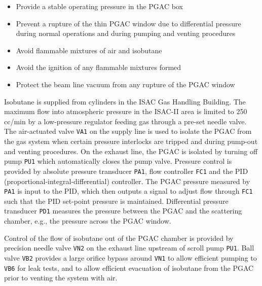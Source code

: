 \begin{itemize}
\setlength{\itemsep}{0pt}
\setlength{\parskip}{0pt}
\setlength{\parsep}{0pt}
	\item Provide a stable operating pressure in the PGAC box
	\item Prevent a rupture of the thin PGAC window due to differential pressure during normal operations and during pumping and venting procedures
	\item Avoid flammable mixtures of air and isobutane
	\item Avoid the ignition of any flammable mixtures formed
	\item Protect the beam line vacuum from any rupture of the PGAC window
\end{itemize}

Isobutane is supplied from cylinders in the ISAC Gas Handling Building. The maximum flow into atmospheric pressure in the ISAC-II area is limited to 250\,cc/min by a low-pressure regulator feeding gas through a pre-set needle valve. The air-actuated valve \texttt{VA1} on the supply line 
is used to isolate the PGAC from the gas system when certain pressure interlocks are tripped and during pump-out and venting procedures.  On the  exhaust line, the PGAC is isolated by turning off pump \texttt{PU1} which automatically closes the pump valve.
Pressure control is provided by absolute pressure transducer \texttt{PA1}, flow controller \texttt{FC1} and the PID (proportional-integral-differential) controller. The PGAC pressure measured by \texttt{PA1} is input to the PID, which then outputs a signal to adjust flow through \texttt{FC1} such that the PID set-point pressure is maintained. %
 Differential pressure transducer \texttt{PD1} measures the pressure between the PGAC and the scattering chamber, e.g., the pressure across the PGAC window.%

Control of the flow of isobutane out of the PGAC chamber is  provided by precision needle valve \texttt{VN2} on the exhaust line upstream of scroll pump \texttt{PU1}. Ball valve \texttt{VB2} provides a large orifice bypass around \texttt{VN1} to allow efficient pumping to \texttt{VB6} for leak tests, and to allow efficient evacuation of isobutane from the PGAC prior to venting the system with air.

